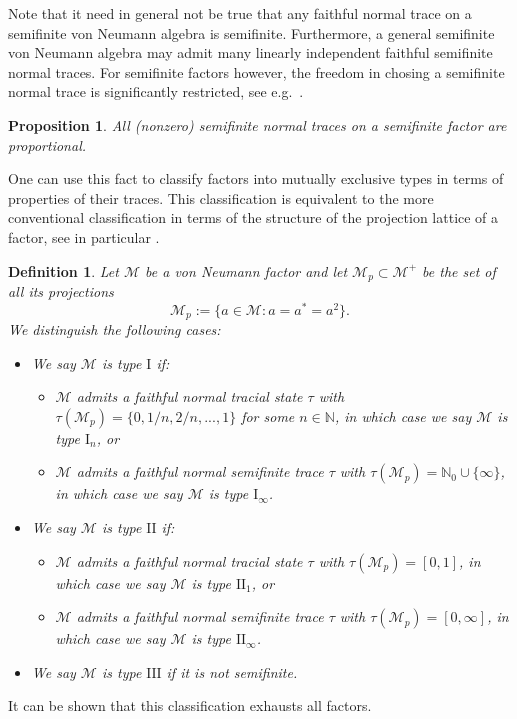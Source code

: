 \documentclass[sn-mathphys-num]{sn-jnl}%
\newcommand{\MM}{\mathcal{M}}
\numberwithin{equation}{section}
\theoremstyle{thmstyleone}%
\newtheorem{proposition}[theorem]{Proposition}%
\theoremstyle{thmstyletwo}%
\theoremstyle{thmstylethree}%
\newtheorem{definition}[theorem]{Definition}%
\begin{document}
    Note that it need in general not be true that any faithful normal trace on a semifinite von Neumann algebra is semifinite. Furthermore, a general semifinite von Neumann algebra may admit many linearly independent faithful semifinite normal traces. For semifinite factors however, the freedom in chosing a semifinite normal trace is significantly restricted, see e.g.\ \cite[Cor.\ V.2.32]{Takesaki2001}.
    \begin{proposition}
        All (nonzero) semifinite normal traces on a semifinite factor are proportional.
    \end{proposition}
    One can use this fact to classify factors into mutually exclusive types in terms of properties of their traces. This classification is equivalent to the more conventional classification in terms of the structure of the projection lattice of a factor, see in particular \cite[Prop.\ 8.5.3-5]{kadison1997fundamentals}.
    \begin{definition}
        Let $\MM$ be a von Neumann factor and let $\MM_p\subset\MM^+$ be the set of all its projections
        \begin{equation}
            \MM_p:=\{a\in\MM:a=a^*=a^2\}.
        \end{equation}
        We distinguish the following cases:
        \begin{itemize}
            \item We say $\MM$ is type $\mathrm{I}$ if:
            \begin{itemize}
                \item $\MM$ admits a faithful normal tracial state $\tau$ with $\tau(\MM_p)=\{0,1/n,2/n,...,1\}$ for some $n\in\mathbb{N}$, in which case we say $\MM$ is type $\mathrm{I}_n$, or
                \item $\MM$ admits a faithful normal semifinite trace $\tau$ with $\tau(\MM_p)=\mathbb{N}_0\cup\{\infty\}$, in which case we say $\MM$ is type $\mathrm{I}_\infty$.
            \end{itemize}
            \item We say $\MM$ is type $\mathrm{II}$ if:
            \begin{itemize}
                \item $\MM$ admits a faithful normal tracial state $\tau$ with $\tau(\MM_p)=[0,1]$, in which case we say $\MM$ is type $\mathrm{II}_1$, or
                \item $\MM$ admits a faithful normal semifinite trace $\tau$ with $\tau(\MM_p)=[0,\infty]$, in which case we say $\MM$ is type $\mathrm{II}_\infty$.
            \end{itemize}
            \item We say $\MM$ is type $\mathrm{III}$ if it is not semifinite.
        \end{itemize}
    \end{definition}
    It can be shown that this classification exhausts all factors. \\
    
\end{document}
